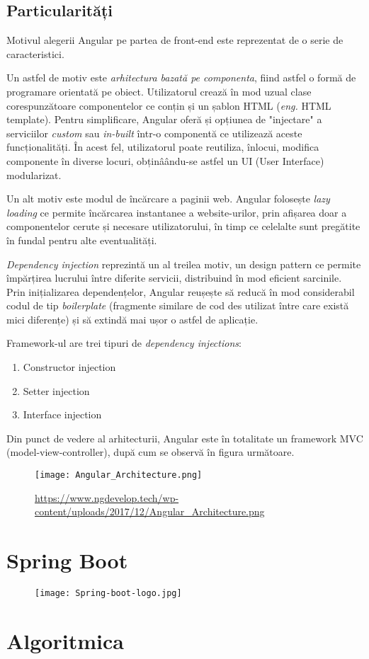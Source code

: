 \subsection{Particularități}
Motivul alegerii Angular pe partea de front-end este reprezentat de o serie de caracteristici.

Un astfel de motiv este \textit{arhitectura bazată pe componenta}, fiind astfel o formă de programare orientată pe obiect. Utilizatorul crează în mod uzual clase corespunzătoare componentelor ce conțin și un șablon HTML (\textit{eng.} HTML template). Pentru simplificare, Angular oferă și opțiunea de "injectare" a serviciilor \textit{custom} sau \textit{in-built} într-o componentă ce utilizează aceste funcționalități. În acest fel, utilizatorul poate reutiliza, înlocui, modifica componente în diverse locuri, obținâându-se astfel un UI (User Interface) modularizat.

Un alt motiv este modul de încărcare a paginii web. Angular folosește \textit{lazy loading} ce permite încărcarea instantanee a website-urilor, prin afișarea doar a componentelor cerute și necesare utilizatorului, în timp ce celelalte sunt pregătite în fundal pentru alte eventualități.

\textit{Dependency injection} reprezintă un al treilea motiv, un design pattern ce permite împărțirea lucrului între diferite servicii, distribuind în mod eficient sarcinile. Prin inițializarea dependențelor, Angular reușește să reducă în mod considerabil codul de tip \textit{boilerplate} (fragmente similare de cod des utilizat între care există mici diferențe) și să extindă mai ușor o astfel de aplicație.

Framework-ul are trei tipuri de \textit{dependency injections}:
\begin{enumerate}
	\item Constructor injection
	\item Setter injection
	\item Interface injection
\end{enumerate}

Din punct de vedere al arhitecturii, Angular este în totalitate un framework MVC (model-view-controller), după cum se observă în figura următoare.

\begin{figure}[H]
	\centering
	\texttt{[image: Angular\_Architecture.png]}
	\caption{\url{https://www.ngdevelop.tech/wp-content/uploads/2017/12/Angular_Architecture.png}}
\end{figure}

\section{Spring Boot}
\begin{figure}[H]
	\centering
	\texttt{[image: Spring-boot-logo.jpg]}
\end{figure}

\section{Algoritmica}
